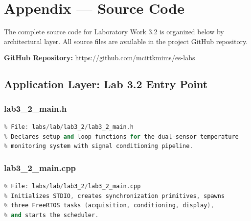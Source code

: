 \section{Appendix --- Source Code}

The complete source code for Laboratory Work 3.2 is organized below by architectural layer. All source files are available in the project GitHub repository.

\textbf{GitHub Repository:} \url{https://github.com/mcittkmims/es-labs}


\subsection{Application Layer: Lab 3.2 Entry Point}

\subsubsection{lab3\_2\_main.h}
\begin{lstlisting}[language=C++, caption=lab3\_2\_main.h --- Lab 3.2 Entry Point Interface, label=lst:appendix_lab3_2_main_h]
% [Full source code - see GitHub repository]
% File: labs/lab/lab3_2/lab3_2_main.h
% Declares setup and loop functions for the dual-sensor temperature
% monitoring system with signal conditioning pipeline.
\end{lstlisting}

\subsubsection{lab3\_2\_main.cpp}
\begin{lstlisting}[language=C++, caption=lab3\_2\_main.cpp --- Lab 3.2 Entry Point Implementation, label=lst:appendix_lab3_2_main_cpp]
% [Full source code - see GitHub repository]
% File: labs/lab/lab3_2/lab3_2_main.cpp
% Initializes STDIO, creates synchronization primitives, spawns
% three FreeRTOS tasks (acquisition, conditioning, display),
% and starts the scheduler.
\end{lstlisting}


